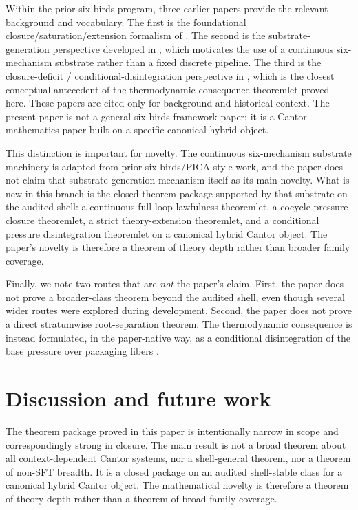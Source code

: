 \documentclass[11pt]{article}
\theoremstyle{definition}
\begin{document}
Within the prior six-birds program, three earlier papers provide the relevant background and vocabulary. The first is the foundational closure/saturation/extension formalism of \cite{TsiokosFoundations}. The second is the substrate-generation perspective developed in \cite{TsiokosCreateStone}, which motivates the use of a continuous six-mechanism substrate rather than a fixed discrete pipeline. The third is the closure-deficit / conditional-disintegration perspective in \cite{TsiokosCastStone}, which is the closest conceptual antecedent of the thermodynamic consequence theoremlet proved here. These papers are cited only for background and historical context. The present paper is not a general six-birds framework paper; it is a Cantor mathematics paper built on a specific canonical hybrid object.

This distinction is important for novelty. The continuous six-mechanism substrate machinery is adapted from prior six-birds/PICA-style work, and the paper does not claim that substrate-generation mechanism itself as its main novelty. What is new in this branch is the closed theorem package supported by that substrate on the audited shell: a continuous full-loop lawfulness theoremlet, a cocycle pressure closure theoremlet, a strict theory-extension theoremlet, and a conditional pressure disintegration theoremlet on a canonical hybrid Cantor object. The paper’s novelty is therefore a theorem of theory depth rather than broader family coverage.

Finally, we note two routes that are \emph{not} the paper’s claim. First, the paper does not prove a broader-class theorem beyond the audited shell, even though several wider routes were explored during development. Second, the paper does not prove a direct stratumwise root-separation theorem. The thermodynamic consequence is instead formulated, in the paper-native way, as a conditional disintegration of the base pressure over packaging fibers \cite{Rokhlin1949FundamentalIdeas,LedrappierWalters1977RelativisedVP,CoverThomas2006InfoTheory}.
 \section{Discussion and future work}\label{sec:discussion}

The theorem package proved in this paper is intentionally narrow in scope and correspondingly strong in closure. The main result is not a broad theorem about all context-dependent Cantor systems, nor a shell-general theorem, nor a theorem of non-SFT breadth. It is a closed package on an audited shell-stable class for a canonical hybrid Cantor object. The mathematical novelty is therefore a theorem of theory depth rather than a theorem of broad family coverage.
\end{document}
